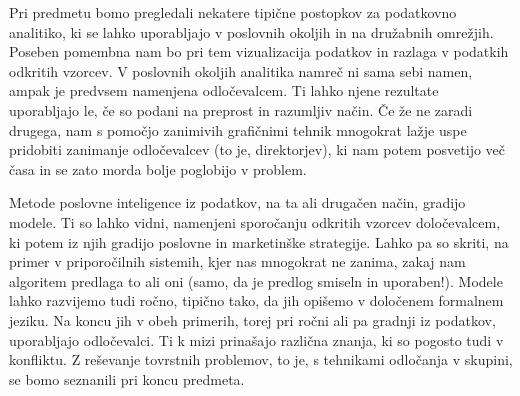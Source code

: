 Pri predmetu bomo pregledali nekatere tipične postopkov za podatkovno
analitiko, ki se lahko uporabljajo v poslovnih okoljih in na družabnih
omrežjih. Poseben pomembna nam bo pri tem vizualizacija podatkov in
razlaga v podatkih odkritih vzorcev. V poslovnih okoljih analitika
namreč ni sama sebi namen, ampak je predvsem namenjena
odločevalcem. Ti lahko njene rezultate uporabljajo le, če so podani na
preprost in razumljiv način. Če že ne zaradi drugega, nam s pomočjo
zanimivih grafičnimi tehnik mnogokrat lažje uspe pridobiti zanimanje
odločevalcev (to je, direktorjev), ki nam potem posvetijo več časa in
se zato morda bolje poglobijo v problem.

Metode poslovne inteligence iz podatkov, na ta ali drugačen način,
gradijo modele. Ti so lahko vidni, namenjeni sporočanju odkritih
vzorcev določevalcem, ki potem iz njih gradijo poslovne in marketinške
strategije. Lahko pa so skriti, na primer v priporočilnih sistemih,
kjer nas mnogokrat ne zanima, zakaj nam algoritem predlaga to ali oni
(samo, da je predlog smiseln in uporaben!). Modele lahko razvijemo
tudi ročno, tipično tako, da jih opišemo v določenem formalnem
jeziku. Na koncu jih v obeh primerih, torej pri ročni ali pa gradnji
iz podatkov, uporabljajo odločevalci. Ti k mizi prinašajo različna
znanja, ki so pogosto tudi v konfliktu. Z reševanje tovrstnih
problemov, to je, s tehnikami odločanja v skupini, se bomo seznanili
pri koncu predmeta.
